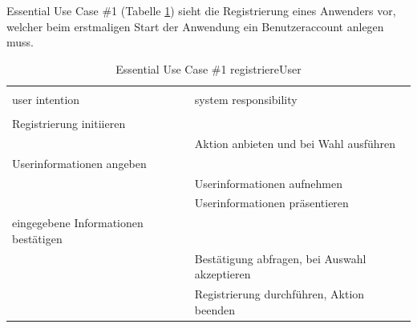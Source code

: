 \newpage
Essential Use Case \#1 (Tabelle \ref{tab:registrieren}) sieht die Registrierung eines Anwenders vor, welcher beim erstmaligen Start der Anwendung ein Benutzeraccount anlegen muss.
\begin{table}[H]
\caption{Essential Use Case \#1 registriereUser }
\centering
\begin{tabular}{l l}
\\ [-0.5ex]

\hline\hline
\\ [-0.5ex]
user intention & system responsibility
\\ [1.5ex]
\hline
\\ [-0.5ex]
Registrierung initiieren            &                                \\[1ex]
                              & Aktion anbieten und bei Wahl ausführen  \\[1ex]
Userinformationen angeben           &                                \\[1ex] 
                              & Userinformationen aufnehmen          \\[1ex]
                              & Userinformationen präsentieren       \\[1ex]
eingegebene Informationen bestätigen   &                                \\[1ex]
                              & Bestätigung abfragen, bei Auswahl akzeptieren  \\[1ex]
                              & Registrierung durchführen, Aktion beenden  \\[1ex]


\hline
\end{tabular}
\label{tab:registrieren}
\end{table}

